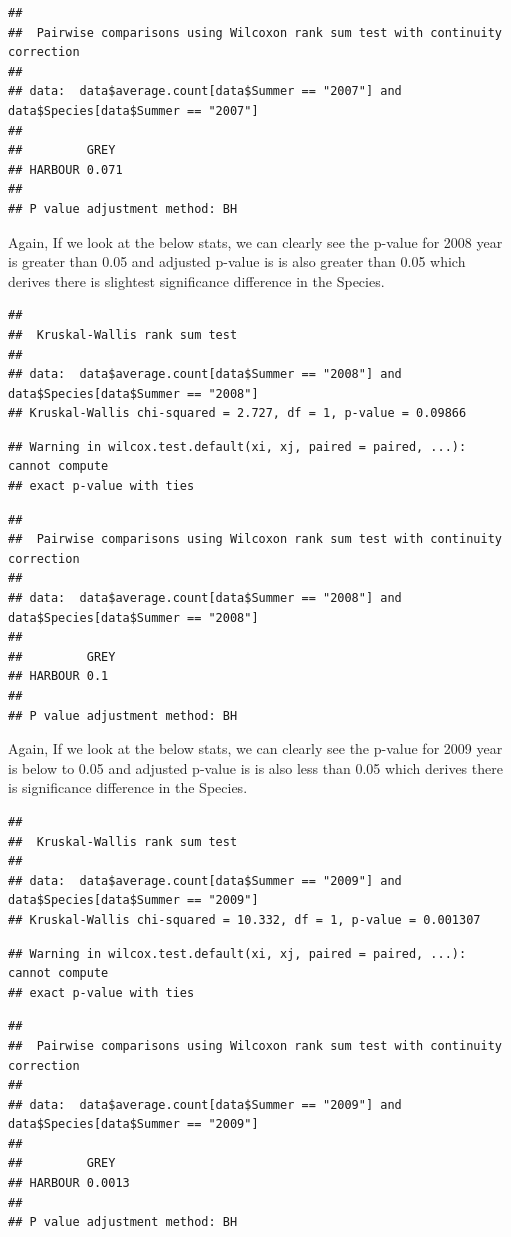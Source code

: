 \documentclass[
]{article}
\begin{document}
\begin{verbatim}
## 
##  Pairwise comparisons using Wilcoxon rank sum test with continuity correction 
## 
## data:  data$average.count[data$Summer == "2007"] and data$Species[data$Summer == "2007"] 
## 
##         GREY 
## HARBOUR 0.071
## 
## P value adjustment method: BH
\end{verbatim}

Again, If we look at the below stats, we can clearly see the p-value for
2008 year is greater than 0.05 and adjusted p-value is is also greater
than 0.05 which derives there is slightest significance difference in
the Species.

\begin{verbatim}
## 
##  Kruskal-Wallis rank sum test
## 
## data:  data$average.count[data$Summer == "2008"] and data$Species[data$Summer == "2008"]
## Kruskal-Wallis chi-squared = 2.727, df = 1, p-value = 0.09866
\end{verbatim}

\begin{verbatim}
## Warning in wilcox.test.default(xi, xj, paired = paired, ...): cannot compute
## exact p-value with ties
\end{verbatim}

\begin{verbatim}
## 
##  Pairwise comparisons using Wilcoxon rank sum test with continuity correction 
## 
## data:  data$average.count[data$Summer == "2008"] and data$Species[data$Summer == "2008"] 
## 
##         GREY
## HARBOUR 0.1 
## 
## P value adjustment method: BH
\end{verbatim}

Again, If we look at the below stats, we can clearly see the p-value for
2009 year is below to 0.05 and adjusted p-value is is also less than
0.05 which derives there is significance difference in the Species.

\begin{verbatim}
## 
##  Kruskal-Wallis rank sum test
## 
## data:  data$average.count[data$Summer == "2009"] and data$Species[data$Summer == "2009"]
## Kruskal-Wallis chi-squared = 10.332, df = 1, p-value = 0.001307
\end{verbatim}

\begin{verbatim}
## Warning in wilcox.test.default(xi, xj, paired = paired, ...): cannot compute
## exact p-value with ties
\end{verbatim}

\begin{verbatim}
## 
##  Pairwise comparisons using Wilcoxon rank sum test with continuity correction 
## 
## data:  data$average.count[data$Summer == "2009"] and data$Species[data$Summer == "2009"] 
## 
##         GREY  
## HARBOUR 0.0013
## 
## P value adjustment method: BH
\end{verbatim}
\end{document}
